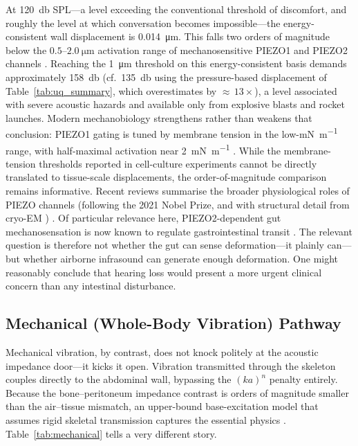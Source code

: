 At \SI{120}{\decibel} SPL---a level exceeding the conventional threshold of
discomfort, and roughly the level at
which conversation becomes impossible---the energy-consistent wall
displacement is \SI{0.014}{\micro\metre}.  This falls two orders of magnitude
below the $0.5$--$\SI{2.0}{\micro\metre}$ activation range of
mechanosensitive PIEZO1 and PIEZO2 channels \cite{coste2010piezo1}.  Reaching the
\SI{1}{\micro\metre} threshold on this energy-consistent basis demands
approximately \SI{158}{\decibel} (cf.\ \SI{135}{\decibel} using the
pressure-based displacement of Table~\ref{tab:uq_summary}, which
overestimates by ${\approx}\,13\times$), a level associated with severe
acoustic hazards and available only from explosive blasts and rocket launches.
Modern mechanobiology strengthens rather than weakens that conclusion:
PIEZO1 gating is tuned by membrane tension in the low-\si{\milli\newton\per\metre}
range, with half-maximal activation near \SI{2}{\milli\newton\per\metre}
\cite{Lewis2015}.  While the membrane-tension thresholds reported in
cell-culture experiments cannot be directly translated to tissue-scale
displacements, the order-of-magnitude comparison remains informative.  Recent
reviews summarise the broader physiological roles of PIEZO channels
(following the 2021 Nobel Prize, and with structural detail from cryo-EM
\cite{Saotome2018}) \cite{Xiao2024}.  Of particular relevance here,
PIEZO2-dependent
gut mechanosensation is now known to regulate gastrointestinal transit
\cite{ServinVences2023}.  The relevant question is therefore not whether the
gut can sense deformation---it plainly can---but whether airborne infrasound
can generate enough deformation.  One might reasonably conclude that hearing
loss would present a more urgent clinical concern than any intestinal
disturbance.

\subsection{Mechanical (Whole-Body Vibration) Pathway}

Mechanical vibration, by contrast, does not knock politely at the acoustic
impedance door---it kicks it open.  Vibration transmitted through the
skeleton couples directly to the abdominal wall, bypassing the $(ka)^n$
penalty entirely.  Because the bone--peritoneum impedance contrast is orders
of magnitude smaller than the air--tissue mismatch, an upper-bound
base-excitation model that assumes rigid skeletal transmission
captures the essential physics \cite{FahyGardonio2007,Gupta2021}.
Table~\ref{tab:mechanical} tells a very different story.

